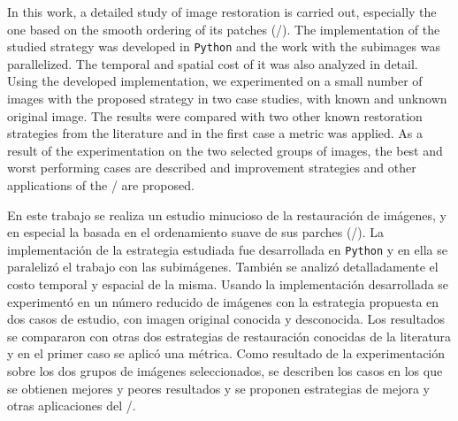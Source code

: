 \begin{eabstract}

In this work, a detailed study of image restoration is carried out, especially the one based on the smooth ordering of its patches (\SOP/). The implementation of the studied strategy was developed in \texttt{Python} and the work with the subimages was parallelized. The temporal and spatial cost of it was also analyzed in detail. Using the developed implementation, we experimented on a small number of images with the proposed strategy in two case studies, with known and unknown original image. The results were compared with two other known restoration strategies from the literature and in the first case a metric was applied. As a result of the experimentation on the two selected groups of images, the best and worst performing cases are described and improvement strategies and other applications of the \SOP/ are proposed.

\end{eabstract}

\begin{sabstract}

En este trabajo se realiza un estudio minucioso de la restauración de imágenes, y en especial la basada en el ordenamiento suave de sus parches (\SOP/). La implementación de la estrategia estudiada fue desarrollada en \texttt{Python} y en ella se paralelizó el trabajo con las subimágenes. También se analizó detalladamente el costo temporal y espacial de la misma. Usando la implementación desarrollada se experimentó en un número reducido de imágenes con la estrategia propuesta en dos casos de estudio, con imagen original conocida y desconocida. Los resultados se compararon con otras dos estrategias de restauración conocidas de la literatura y en el primer caso se aplicó una métrica. Como resultado de la experimentación sobre los dos grupos de imágenes seleccionados, se describen los casos en los que se obtienen mejores y peores resultados y se proponen estrategias de mejora y otras aplicaciones del \SOP/.

\end{sabstract}